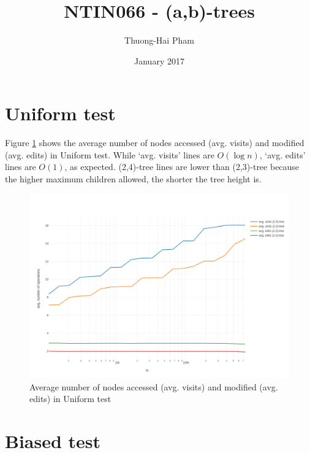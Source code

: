 \documentclass{article}
\title{NTIN066 - (a,b)-trees}
\author{Thuong-Hai Pham}
\date{January 2017}
\begin{document}
\maketitle

\section{Uniform test}

Figure \ref{fig:uni} shows the average number of nodes accessed (avg. visits) and modified (avg. edits) in Uniform test. While `avg. visits' lines are $O(\log n)$, `avg. edits' lines are $O(1)$, as expected. (2,4)-tree lines are lower than (2,3)-tree because the higher maximum children allowed, the shorter the tree height is.

\begin{figure}[h!]
\centering
\includegraphics[width=\textwidth]{NTIN066-abtree-plot1.png}
\caption{Average number of nodes accessed (avg. visits) and modified (avg. edits) in Uniform test}
\label{fig:uni}
\end{figure}

\section{Biased test}
\end{document}
